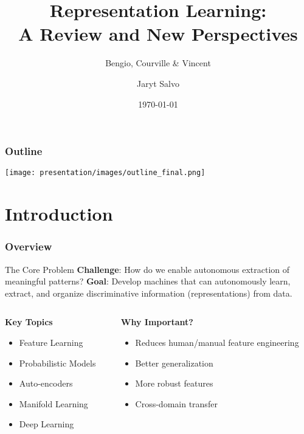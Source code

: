 \documentclass{beamer}
\title{Representation Learning:\\A Review and New Perspectives}
\subtitle{Bengio, Courville \& Vincent}
\author{Jaryt Salvo}
\institute{CS 7300 Unsupervised Learning | BGSU}
\date{\today}
\begin{document}
\begin{frame}[fragile]
\titlepage
\end{frame}

\begin{frame}[fragile]
\frametitle{Outline}
    \texttt{[image: presentation/images/outline\_final.png]}
\end{frame}

\section{Introduction}

\begin{frame}[fragile]
\frametitle{Overview}

\begin{block}{The Core Problem}
    \textbf{Challenge}: How do we enable autonomous extraction of meaningful patterns?
    \vspace{0.2cm} \newline
    \textbf{Goal}: Develop machines that can autonomously learn, extract, and organize discriminative information (representations) from data.
\end{block}
\pause

\vspace{0.25cm}

\begin{columns}[T]
    \begin{column}{0.48\textwidth}
        \textbf{Key Topics}
        \begin{itemize}
            \item Feature Learning
            \item Probabilistic Models
            \item Auto-encoders
            \item Manifold Learning
            \item Deep Learning
        \end{itemize}
    \end{column}
    \pause
    
    \begin{column}{0.48\textwidth}
        \textbf{Why Important?}
        \begin{itemize}
            \item Reduces human/manual feature engineering
            \item Better generalization
            \item More robust features
            \item Cross-domain transfer
        \end{itemize}
    \end{column}
\end{columns}

\end{frame}
\end{document}
